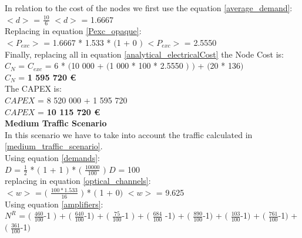 In relation to the cost of the nodes we first use the equation \ref{average_demand}:\\

$<d>$ = $\frac{10}{6}$ \qquad \qquad $<d>$ = 1.6667\\

Replacing in equation \ref{Pexc_opaque}:\\

$<P_{exc}>$ = 1.6667 * 1.533 * $($1 + $0$ $)$ \qquad \qquad $<P_{exc}>$ = 2.5550 \\

Finally, replacing all in equation \ref{analytical_electricalCost} the Node Cost is:\\

$C_N$ = $C_{exc}$ = 6 * $($10 000 + $($1 000 * 100 * 2.5550 $)$ $)$ + $($20 * 136$)$\\

$C_N$ = \textbf{1 595 720 \euro}\\

The CAPEX is:\\
$CAPEX$ = 8 520 000 + 1 595 720\\

$CAPEX$ = \textbf{10 115 720 \euro}\\

\textbf{Medium Traffic Scenario}\\
In this scenario we have to take into account the traffic calculated in \ref{medium_traffic_scenario}.\\

Using equation \ref{demands}:\\

$D$ = $\frac{1}{2}$ * $($ 1 + 1 $)$ * $($ $\frac{10 000}{100}$ $)$ \qquad \qquad $D$ = 100\\

replacing in equation \ref{optical_channels}:\\

$<w>$ = $($ $\frac{100 * 1.533}{16}$ $)$ * $($ 1 + 0$)$ \qquad \quad $<w>$ = 9.625\\

Using equation \ref{amplifiers}:\\

$N^R$ = $($ $\frac{460}{100}$-1 $)$ + $($ $\frac{640}{100}$-1$)$ + $($ $\frac{75}{100}$-1 $)$ + $($ $\frac{684}{100}$ -1$)$ + $($ $\frac{890}{100}$-1$)$ + $($ $\frac{103}{100}$-1$)$ + $($ $\frac{761}{100}$-1$)$ + $($ $\frac{361}{100}$-1$)$\\

